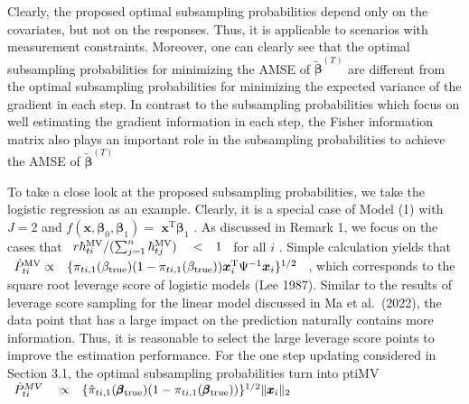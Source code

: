 \documentclass[
  10
]{article}
\begin{document}
Clearly, the proposed optimal subsampling probabilities depend only on
the covariates, but not on the responses. Thus, it is applicable to
scenarios with measurement constraints. Moreover, one can clearly see
that the optimal subsampling probabilities for minimizing the AMSE of
\(\tilde { \boldsymbol { \beta } } ^ { ( T ) }\) are different from the
optimal subsampling probabilities for minimizing the expected variance
of the gradient in each step. In contrast to the subsampling
probabilities which focus on well estimating the gradient information in
each step, the Fisher information matrix also plays an important role in
the subsampling probabilities to achieve the AMSE of
\(\tilde { \boldsymbol { \beta } } ^ { ( T ) }\)

To take a close look at the proposed subsampling probabilities, we take
the logistic regression as an example. Clearly, it is a special case of
Model (1) with \(J = 2\) and
\(f ( \pmb { x } , \pmb { \beta } _ { 0 } , \pmb { \beta } _ { 1 } ) =\)
\(\pmb { x } ^ { \mathrm { T } } \pmb { \beta } _ { 1 }\) . As discussed
in Remark 1, we focus on the cases that
\(\begin{array} { r l r } { r \hbar _ { t i } ^ { \mathrm { M V } } / ( \sum _ { j = 1 } ^ { n } \hbar _ { t j } ^ { \mathrm { M V } } ) } & { { } < } & { 1 } \end{array}\)
for all \(i\) . Simple calculation yields that
\(\begin{array} { r l } { \dot { P } _ { t i } ^ { \mathrm { M V } } \propto } & { { } \{ \pi _ { t i , 1 } ( \beta _ { \mathrm { t r u e } } ) ( 1 - \pi _ { t i , 1 } ( \beta _ { \mathrm { t r u e } } ) ) { \boldsymbol x } _ { i } ^ { \mathrm { T } } \Psi ^ { - 1 } { \boldsymbol x } _ { i } \} ^ { 1 / 2 } } \end{array}\)
, which corresponds to the square root leverage score of logistic models
(Lee 1987). Similar to the results of leverage score sampling for the
linear model discussed in Ma et al.~(2022), the data point that has a
large impact on the prediction naturally contains more information.
Thus, it is reasonable to select the large leverage score points to
improve the estimation performance. For the one step updating considered
in Section 3.1, the optimal subsampling probabilities turn into ptiMV
\(\begin{array} { r l r } { \dot { P } _ { t i } ^ { M V } } & { { } \propto } & { \{ \hat { \pi } _ { t i , 1 } ( \pmb { \beta } _ { \mathrm { t r u e } } ) ( 1 - \pi _ { t i , 1 } ( \pmb { \beta } _ { \mathrm { t r u e } } ) ) \} ^ { 1 / 2 } \| \pmb { x } _ { i } \| _ { 2 } } \end{array}\)
\end{document}
